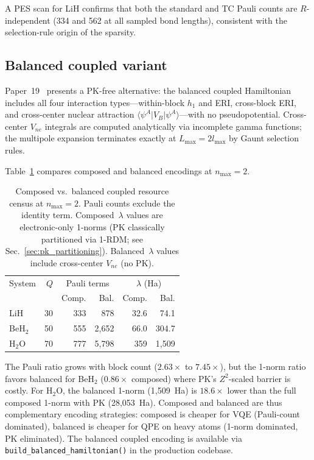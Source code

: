 \documentclass[aps,pra,twocolumn,superscriptaddress,longbibliography]{revtex4-2}
\begin{document}
A PES scan for LiH confirms that both the standard and TC Pauli
counts are $R$-independent (334 and 562 at all sampled bond lengths),
consistent with the selection-rule origin of the sparsity.

\subsection{Balanced coupled variant}
\label{sec:balanced_coupled}

Paper~19~\cite{loutey_paper19} presents a PK-free alternative: the
balanced coupled Hamiltonian includes all four interaction
types---within-block $h_1$ and ERI, cross-block ERI, and cross-center
nuclear attraction $\langle \psi^A | V_B | \psi^A \rangle$---with no
pseudopotential.  Cross-center $V_{ne}$ integrals are computed
analytically via incomplete gamma functions; the multipole expansion
terminates exactly at $L_{\max} = 2 l_{\max}$ by Gaunt selection
rules.

Table~\ref{tab:balanced} compares composed and balanced encodings
at $n_{\max} = 2$.

\begin{table}[t]
\caption{Composed vs.\ balanced coupled resource census at
$n_{\max} = 2$.  Pauli counts exclude the identity term.
Composed~$\lambda$ values are electronic-only 1-norms
(PK classically partitioned via 1-RDM; see Sec.~\ref{sec:pk_partitioning}).
Balanced~$\lambda$ values include cross-center $V_{ne}$ (no PK).}
\label{tab:balanced}
\begin{ruledtabular}
\begin{tabular}{lrrrrr}
System & $Q$ & \multicolumn{2}{c}{Pauli terms}
  & \multicolumn{2}{c}{$\lambda$ (Ha)} \\
  & & Comp. & Bal. & Comp. & Bal. \\
\hline
LiH     &  30 &    333 &    878 &  32.6 &   74.1 \\
BeH$_2$ &  50 &    555 & 2{,}652 &  66.0 &  304.7 \\
H$_2$O  &  70 &    777 & 5{,}798 & 359   & 1{,}509 \\
\end{tabular}
\end{ruledtabular}
\end{table}

The Pauli ratio grows with block count ($2.63\times$ to $7.45\times$),
but the 1-norm ratio favors balanced for BeH$_2$ ($0.86\times$
composed) where PK's $Z^2$-scaled barrier is costly.  For H$_2$O,
the balanced 1-norm (1{,}509~Ha) is $18.6\times$ lower than the
full composed 1-norm with PK (28{,}053~Ha).  Composed and balanced
are thus complementary encoding strategies: composed is cheaper for
VQE (Pauli-count dominated), balanced is cheaper for QPE on heavy
atoms (1-norm dominated, PK eliminated).  The balanced coupled
encoding is available via \texttt{build\_balanced\_hamiltonian()}
in the production codebase.
\end{document}
